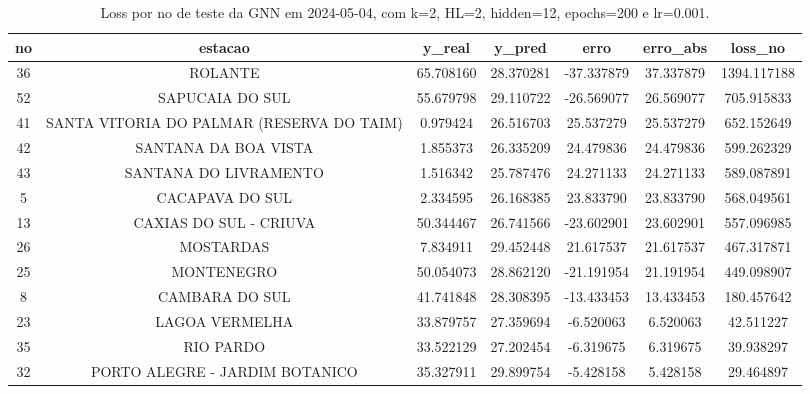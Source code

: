 \begin{table}[h]
\centering
\caption{Loss por no de teste da GNN em 2024-05-04, com k=2, HL=2, hidden=12, epochs=200 e lr=0.001.}
\label{tab:gnn_loss_k2_hl2_h12_e200_d20240504}
\begin{tabular}{ccccccc}
\toprule
no & estacao & y\_real & y\_pred & erro & erro\_abs & loss\_no \\
\midrule
36 & ROLANTE & 65.708160 & 28.370281 & -37.337879 & 37.337879 & 1394.117188 \\
52 & SAPUCAIA DO SUL & 55.679798 & 29.110722 & -26.569077 & 26.569077 & 705.915833 \\
41 & SANTA VITORIA DO PALMAR (RESERVA DO TAIM) & 0.979424 & 26.516703 & 25.537279 & 25.537279 & 652.152649 \\
42 & SANTANA DA BOA VISTA & 1.855373 & 26.335209 & 24.479836 & 24.479836 & 599.262329 \\
43 & SANTANA DO LIVRAMENTO & 1.516342 & 25.787476 & 24.271133 & 24.271133 & 589.087891 \\
5 & CACAPAVA DO SUL & 2.334595 & 26.168385 & 23.833790 & 23.833790 & 568.049561 \\
13 & CAXIAS DO SUL - CRIUVA & 50.344467 & 26.741566 & -23.602901 & 23.602901 & 557.096985 \\
26 & MOSTARDAS & 7.834911 & 29.452448 & 21.617537 & 21.617537 & 467.317871 \\
25 & MONTENEGRO & 50.054073 & 28.862120 & -21.191954 & 21.191954 & 449.098907 \\
8 & CAMBARA DO SUL & 41.741848 & 28.308395 & -13.433453 & 13.433453 & 180.457642 \\
23 & LAGOA VERMELHA & 33.879757 & 27.359694 & -6.520063 & 6.520063 & 42.511227 \\
35 & RIO PARDO & 33.522129 & 27.202454 & -6.319675 & 6.319675 & 39.938297 \\
32 & PORTO ALEGRE - JARDIM BOTANICO & 35.327911 & 29.899754 & -5.428158 & 5.428158 & 29.464897 \\
\bottomrule
\end{tabular}
\end{table}
